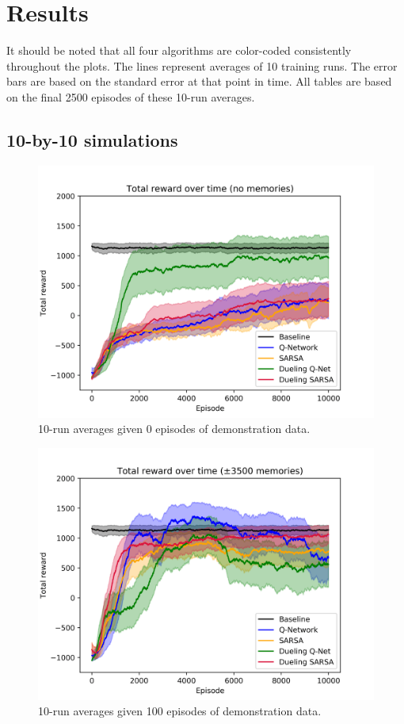 
\section{Results}
It should be noted that all four algorithms are color-coded consistently throughout the plots. The lines represent averages of 10 training runs. The error bars are based on the standard error at that point in time. All tables are based on the final 2500 episodes of these 10-run averages.
\subsection{10-by-10 simulations}
\begin{figure}[H]
    \centering
    \includegraphics[width=\linewidth]{img/results/10-sized/total_rewards_0m-min.png}
    \caption{10-run averages given 0 episodes of demonstration data.}
    \label{fig:10sized-0mem}
\end{figure}
\begin{figure}[H]
    \centering
    \includegraphics[width=\linewidth]{img/results/10-sized/total_rewards_100m-min.png}
    \caption{10-run averages given 100 episodes of demonstration data.}
    \label{fig:10sized-100mem}
\end{figure}
